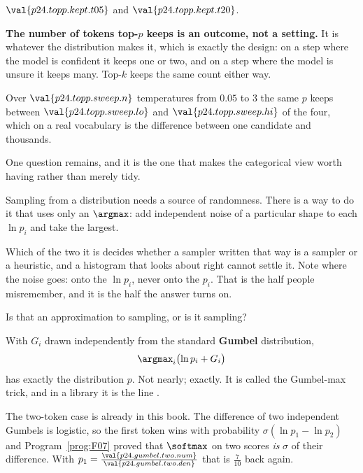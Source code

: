 \begin{fr}
\begin{ansblock}
$\val{p24.topp.kept.t05}$ and $\val{p24.topp.kept.t20}$.
\end{ansblock}

\textbf{The number of tokens top-$p$ keeps is an outcome, not a setting.} It is
whatever the distribution makes it, which is exactly the design: on a step
where the model is confident it keeps one or two, and on a step where the model
is unsure it keeps many. Top-$k$ keeps the same count either way.

Over $\val{p24.topp.sweep.n}$ temperatures from $\num{0.05}$ to $3$ the same
$p$ keeps between $\val{p24.topp.sweep.lo}$ and $\val{p24.topp.sweep.hi}$ of
the four, which on a real vocabulary is the difference between one candidate
and thousands.

\end{fr}

\begin{fr}
One question remains, and it is the one that makes the categorical view worth
having rather than merely tidy.

Sampling from a distribution needs a source of randomness. There is a way to do
it that uses only an $\argmax$: add independent noise of a particular shape to
each $\ln p_i$ and take the largest.

Which of the two it is decides whether a sampler written that way is a sampler
or a heuristic, and a histogram that looks about right cannot settle it. Note
where the noise goes: onto the $\ln p_i$, never onto the $p_i$. That is the
half people misremember, and it is the half the answer turns on.

Is that an approximation to sampling, or is it sampling?
\dotline
\nextframe
\end{fr}

\begin{fr}

With $G_i$ drawn independently from the standard \textbf{Gumbel} distribution,
\[ \argmax_i \bigl(\ln p_i + G_i\bigr) \]
has exactly the distribution $p$. Not nearly; exactly. It is called the
Gumbel-max trick, and in a library it is the line
.

The two-token case is already in this book. The difference of two independent
Gumbels is logistic, so the first token wins with probability
$\sigma(\ln p_1 - \ln p_2)$ \dash{} and Program~\ref{prog:F07} proved that
$\softmax$ on two scores \emph{is} $\sigma$ of their difference. With
$p_1 = \frac{\val{p24.gumbel.two.num}}{\val{p24.gumbel.two.den}}$ that is
$\frac{7}{10}$ back again.
\end{fr}


